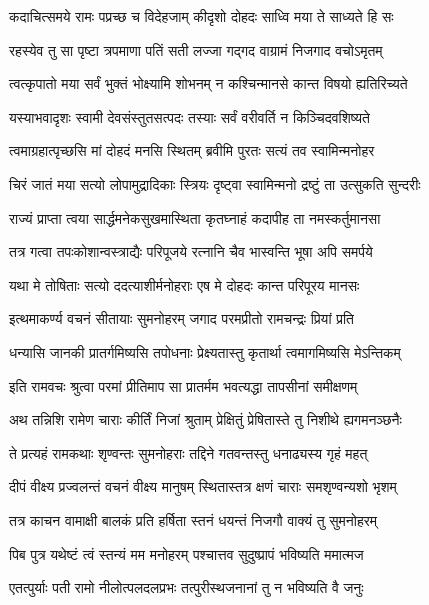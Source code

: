 \twolineshloka
{कदाचित्समये रामः पप्रच्छ च विदेहजाम्}
{कीदृशो दोहदः साध्वि मया ते साध्यते हि सः}%

\twolineshloka
{रहस्येव तु सा पृष्टा त्रपमाणा पतिं सती}
{लज्जा गद्गद वाग्रामं निजगाद वचोऽमृतम्}%


\twolineshloka
{त्वत्कृपातो मया सर्वं भुक्तं भोक्ष्यामि शोभनम्}
{न कश्चिन्मानसे कान्त विषयो ह्यतिरिच्यते}%

\twolineshloka
{यस्याभवादृशः स्वामी देवसंस्तुतसत्पदः}
{तस्याः सर्वं वरीवर्ति न किञ्चिदवशिष्यते}%

\twolineshloka
{त्वमाग्रहात्पृच्छसि मां दोहदं मनसि स्थितम्}
{ब्रवीमि पुरतः सत्यं तव स्वामिन्मनोहर}%

\twolineshloka
{चिरं जातं मया सत्यो लोपामुद्रादिकाः स्त्रियः}
{दृष्ट्वा स्वामिन्मनो द्रष्टुं ता उत्सुकति सुन्दरीः}%

\twolineshloka
{राज्यं प्राप्ता त्वया सार्द्धमनेकसुखमास्थिता}
{कृतघ्नाहं कदापीह ता नमस्कर्तुमानसा}%

\twolineshloka
{तत्र गत्वा तपःकोशान्वस्त्राद्यैः परिपूजये}
{रत्नानि चैव भास्वन्ति भूषा अपि समर्पये}%

\twolineshloka
{यथा मे तोषिताः सत्यो ददत्याशीर्मनोहराः}
{एष मे दोहदः कान्त परिपूरय मानसः}%

\twolineshloka
{इत्थमाकर्ण्य वचनं सीतायाः सुमनोहरम्}
{जगाद परमप्रीतो रामचन्द्रः प्रियां प्रति}%

\twolineshloka
{धन्यासि जानकी प्रातर्गमिष्यसि तपोधनाः}
{प्रेक्ष्यतास्तु कृतार्था त्वमागमिष्यसि मेऽन्तिकम्}%

\twolineshloka
{इति रामवचः श्रुत्वा परमां प्रीतिमाप सा}
{प्रातर्मम भवत्यद्धा तापसीनां समीक्षणम्}%

\twolineshloka
{अथ तन्निशि रामेण चाराः कीर्तिं निजां श्रुताम्}
{प्रेक्षितुं प्रेषितास्ते तु निशीथे ह्यगमनञ्छनैः}%

\twolineshloka
{ते प्रत्यहं रामकथाः शृण्वन्तः सुमनोहराः}
{तद्दिने गतवन्तस्तु धनाढ्यस्य गृहं महत्}%

\twolineshloka
{दीपं वीक्ष्य प्रज्वलन्तं वचनं वीक्ष्य मानुषम्}
{स्थितास्तत्र क्षणं चाराः समशृण्वन्यशो भृशम्}%

\twolineshloka
{तत्र काचन वामाक्षी बालकं प्रति हर्षिता}
{स्तनं धयन्तं निजगौ वाक्यं तु सुमनोहरम्}%

\twolineshloka
{पिब पुत्र यथेष्टं त्वं स्तन्यं मम मनोहरम्}
{पश्चात्तव सुदुष्प्रापं भविष्यति ममात्मज}%

\twolineshloka
{एतत्पुर्याः पती रामो नीलोत्पलदलप्रभः}
{तत्पुरीस्थजनानां तु न भविष्यति वै जनुः}%

